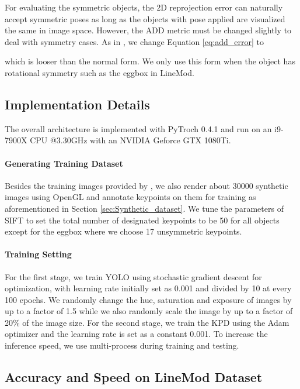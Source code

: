 \documentclass[10pt,twocolumn,letterpaper]{article}
\begin{document}
 For evaluating the symmetric objects, the 2D reprojection error can naturally accept symmetric poses as long as the objects with pose applied are visualized the same in image space. However, the ADD metric must be changed slightly to deal with symmetry cases. As in \cite{7780735,Hinterstoisser:2012:MBT:2481913.2481959,tekin18}, we change Equation \ref{eq:add_error}  to

which is looser than the normal form. We only use this form when the object has rotational symmetry such as the eggbox in LineMod.

\subsection{Implementation Details}
The overall architecture is implemented with PyTroch 0.4.1 and run on an i9-7900X CPU @3.30GHz with an NVIDIA Geforce GTX 1080Ti.

\paragraph{Generating Training Dataset} Besides the training images provided by \cite{tekin18}, we also render about 30000 synthetic images using OpenGL and annotate keypoints on them for training as aforementioned in Section \ref{sec:Synthetic_dataset}. We tune the parameters of SIFT to set the total number of designated keypoints to be 50 for all objects except for the eggbox where we choose 17 unsymmetric keypoints.

\paragraph{Training Setting} For the first stage, we train YOLO using stochastic gradient descent for optimization, with learning rate initially set as 0.001 and divided by 10 at every 100 epochs. We randomly change the hue, saturation and exposure of images by up to a factor of 1.5 while we also randomly scale the image by up to a factor of 20\% of the image size. For the second stage, we train the KPD using the Adam optimizer \cite{Kingma2014AdamAM} and the learning rate is set as a constant 0.001. To increase the inference speed, we use multi-process during training and testing.

\subsection{Accuracy and Speed on LineMod Dataset}
\end{document}
